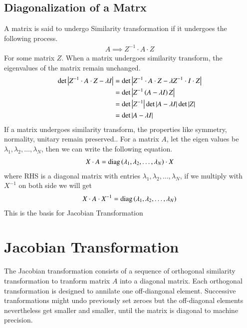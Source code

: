 \documentclass[a4paper,12pt]{article}
\theoremstyle{remark}
\begin{document}
\subsection*{Diagonalization of a Matrx}
A matrix is said to undergo Similarity transformation if it undergoes the following process.
\begin{align}
	A \implies Z^{-1}\cdot A\cdot Z
\end{align}
For some matrix $Z$. When a matrix undergoes similarity transform, the eigenvalues of the matrix remain unchanged.
\begin{align}
	\det\left\vert Z^{-1}\cdot A\cdot Z - \lambda I\right\vert &= \det\left\vert Z^{-1}\cdot A\cdot Z - \lambda Z^{-1}\cdot I\cdot Z\right\vert\\
		&= \det\left\vert Z^{-1}\left(A - \lambda I \right)Z\right\vert\\
		&= \det\left\vert Z^{-1}\right\vert\det\left\vert A - \lambda I\right\vert\det\left\vert Z\right\vert\\
		&= \det\left\vert A - \lambda I\right\vert 
\end{align}
If a matrix undergoes similarity transform, the properties like symmetry, normality, unitary remain preserved..
For a matrix $A$, let the eigen values be $\lambda_1, \lambda_2,\dots,\lambda_N$, then we can write the following equation.
\begin{align}
	X\cdot A= \text{diag}\left(\lambda_1, \lambda_2,\dots,\lambda_N\right)\cdot X\\
\end{align}
where RHS is a diagonal matrix with entries $\lambda_1, \lambda_2,\dots,\lambda_N$, if we multiply with $X^{-1}$ on both side we will get
\begin{align}
	X \cdot A \cdot X^{-1} = \text{diag}\left(\lambda_1, \lambda_2,\dots,\lambda_N\right)
\end{align}
This is the basis for Jacobian Transformation

\section{Jacobian Transformation}
The Jacobian transformation consists of a sequence of orthogonal similarity transformation  to tranform matrix $A$ into a diagonal matrix. Each orthogonal transformation is designed to annilate one off-diangonal element. Successive tranformations might undo previously set zeroes but the off-diagonal elements nevertheless get smaller and smaller, until the matrix is diagonal to machine precision.
\end{document}
